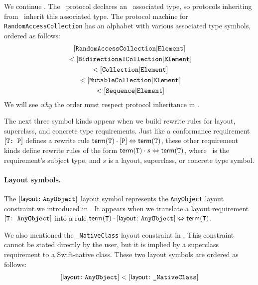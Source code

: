 \documentclass[../generics]{subfiles}
\begin{document}
\begin{example}
We continue . The \tSequence\ protocol declares an \nElement\ associated type, so protocols inheriting from \tSequence\ inherit this associated type. The protocol machine for \texttt{RandomAccessCollection} has an alphabet with various associated type symbols, ordered as follows:
\begin{gather*}
[\texttt{RandomAccessCollection}|\texttt{Element}]\\
{} < [\texttt{BidirectionalCollection}|\texttt{Element}]\\
{} < [\texttt{Collection}|\texttt{Element}]\\
{} < [\texttt{MutableCollection}|\texttt{Element}]\\
{} < [\texttt{Sequence}|\texttt{Element}]
\end{gather*}
We will see \emph{why} the order must respect protocol inheritance in .
\end{example}

\medskip

The next three symbol kinds appear when we build rewrite rules for layout, superclass, and concrete type requirements. Just like a conformance requirement $[\texttt{T:~P}]$ defines a rewrite rule $\mathsf{term}(\texttt{T})\cdot[\texttt{P}]\Leftrightarrow\mathsf{term}(\texttt{T})$, these other requirement kinds define rewrite rules of the form $\mathsf{term}(\texttt{T})\cdot s\Leftrightarrow\mathsf{term}(\texttt{T})$, where \tT\ is the requirement's subject type, and $s$ is a layout, superclass, or concrete type symbol.

\paragraph{Layout symbols.} The $[\mathsf{layout}\colon\texttt{AnyObject}]$ layout symbol represents the \texttt{AnyObject} layout constraint we introduced in . It appears when we translate a layout requirement $[\texttt{T:~AnyObject}]$ into a rule $\mathsf{term}(\texttt{T})\cdot[\mathsf{layout}\colon\texttt{AnyObject}] \Leftrightarrow \mathsf{term}(\texttt{T})$.

We also mentioned the \verb|_NativeClass| layout constraint in . This constraint cannot be stated directly by the user, but it is implied by a superclass requirement to a Swift-native class. These two layout symbols are ordered as follows:
\[\layoutsym{AnyObject} < \layoutsym{\char`_NativeClass}\]
\end{document}
